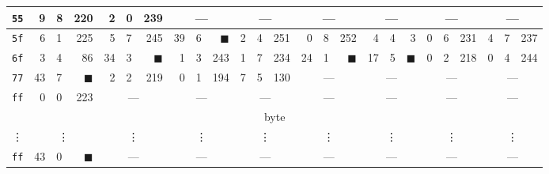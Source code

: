\begin{tabular}{| c | r@{.} l@{\quad}r | r@{.} l@{\quad}r | r@{.} l@{\quad}r | r@{.} l@{\quad}r | r@{.} l@{\quad}r | r@{.} l@{\quad}r | r@{.} l@{\quad}r | r@{.} l@{\quad}r |}
	\hline
	{\tt 55}&9&8&220&2&0&239&\multicolumn{3}{c|}{---}&\multicolumn{3}{c|}{---}&\multicolumn{3}{c|}{---}&\multicolumn{3}{c|}{---}&\multicolumn{3}{c|}{---}&\multicolumn{3}{c|}{---}\\
	\hline
	{\tt 5f}&6&1&225&5&7&245&39&6&$\blacksquare$&2&4&251&0&8&252&4&4&3&0&6&231&4&7&237\\
	\hline
	{\tt 6f}&3&4&86&34&3&$\blacksquare$&1&3&243&1&7&234&24&1&$\blacksquare$&17&5&$\blacksquare$&0&2&218&0&4&244\\
	\hline
	{\tt 77}&43&7&$\blacksquare$&2&2&219&0&1&194&7&5&130&\multicolumn{3}{c|}{---}&\multicolumn{3}{c|}{---}&\multicolumn{3}{c|}{---}&\multicolumn{3}{c|}{---}\\
	\hline
	{\tt ff}&0&0&223&\multicolumn{3}{c|}{---}&\multicolumn{3}{c|}{---}&\multicolumn{3}{c|}{---}&\multicolumn{3}{c|}{---}&\multicolumn{3}{c|}{---}&\multicolumn{3}{c|}{---}&\multicolumn{3}{c|}{---}\\
	\hline
	\hline
	\multicolumn{25}{|c|}{\nth{4} byte} \\
	\hline
	\vdots & \multicolumn{3}{c|}{\vdots} & \multicolumn{3}{c|}{\vdots} & \multicolumn{3}{c|}{\vdots} & \multicolumn{3}{c|}{\vdots} & \multicolumn{3}{c|}{\vdots} & \multicolumn{3}{c|}{\vdots} & \multicolumn{3}{c|}{\vdots} & \multicolumn{3}{c|}{\vdots} \\
	\hline
	{\tt ff}&43&0&$\blacksquare$&\multicolumn{3}{c|}{---}&\multicolumn{3}{c|}{---}&\multicolumn{3}{c|}{---}&\multicolumn{3}{c|}{---}&\multicolumn{3}{c|}{---}&\multicolumn{3}{c|}{---}&\multicolumn{3}{c|}{---}\\
	\hline
\end{tabular}